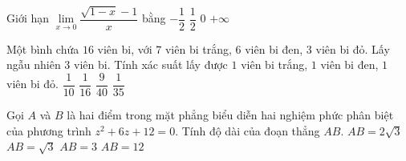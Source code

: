 \begin{ex}%
	Giới hạn $\lim\limits_{x\to 0}\dfrac{\sqrt{1-x}-1}{x}$ bằng
	\choice
	{\True $-\dfrac{1}{2}$}
	{$\dfrac{1}{2}$}
	{$0$}
	{$+\infty$}
\end{ex}

\begin{ex}%
	Một bình chứa $16$ viên bi, với $7$ viên bi trắng, $6$ viên bi đen, $3$ viên bi đỏ. Lấy ngẫu nhiên $3$ viên bi. Tính xác suất lấy được $1$ viên bi trắng, $1$ viên bi đen, $1$ viên bi đỏ.
	\choice
	{$\dfrac{1}{10}$}
	{$\dfrac{1}{16}$}
	{\True $\dfrac{9}{40}$}
	{$\dfrac{1}{35}$}
\end{ex}

\begin{ex}%
	Gọi $A$ và $B$ là hai điểm trong mặt phẳng biểu diễn hai nghiệm phức phân biệt của phương trình $z^2+6z+12=0$. Tính độ dài của đoạn thẳng $AB$.
	\choice
	{\True $AB=2\sqrt{3}$}
	{$AB=\sqrt{3}$}
	{$AB=3$}
	{$AB=12$}
\end{ex}

